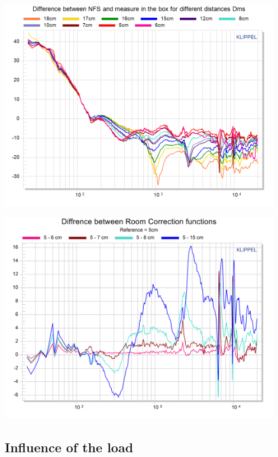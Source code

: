 \documentclass{report}
\begin{document}
\begin{minipage}{0.5\textwidth}
\begin{center}
	\includegraphics[width=0.9\textwidth]{RoomComp/MicPos_Diff_NFS_TRF} 
    \captionsetup{hypcap=false} 
	\label{fig:MicPosDiffNFS}
\end{center}
\end{minipage}
\begin{minipage}{0.5\textwidth}
\begin{center}
	\includegraphics[width=0.9\textwidth]{RoomComp/MicPos_Diff_RefMEas} 
    \captionsetup{hypcap=false} 
	\label{fig:MicPosDiffRC}
\end{center}
\end{minipage}


\subsection{Influence of the load}
\end{document}
